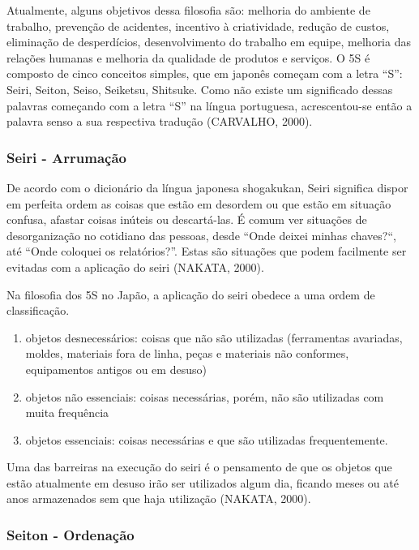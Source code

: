 \documentclass[
]{article}
\begin{document}
Atualmente, alguns objetivos dessa filosofia são: melhoria do ambiente de trabalho, prevenção de acidentes, incentivo à criatividade, redução de custos, eliminação de desperdícios, desenvolvimento do trabalho em equipe, melhoria das relações humanas e melhoria da qualidade de produtos e serviços. O 5S é composto de cinco conceitos simples, que em japonês começam com a letra ``S'': Seiri, Seiton, Seiso, Seiketsu, Shitsuke. Como não existe um significado dessas palavras começando com a letra ``S'' na língua portuguesa, acrescentou-se então a palavra senso a sua respectiva tradução (CARVALHO, 2000).

\hypertarget{seiri---arrumauxe7uxe3o}{%
\subsubsection{Seiri - Arrumação}\label{seiri---arrumauxe7uxe3o}}

De acordo com o dicionário da língua japonesa shogakukan, Seiri significa dispor em perfeita ordem as coisas que estão em desordem ou que estão em situação confusa, afastar coisas inúteis ou descartá-las. É comum ver situações de desorganização no cotidiano das pessoas, desde ``Onde deixei minhas chaves?{}``, até ``Onde coloquei os relatórios?''. Estas são situações que podem facilmente ser evitadas com a aplicação do seiri (NAKATA, 2000).

Na filosofia dos 5S no Japão, a aplicação do seiri obedece a uma ordem de classificação.

\begin{enumerate}
\def\labelenumi{\alph{enumi})}
\item
  objetos desnecessários: coisas que não são utilizadas (ferramentas avariadas, moldes, materiais fora de linha, peças e materiais não conformes, equipamentos antigos ou em desuso)
\item
  objetos não essenciais: coisas necessárias, porém, não são utilizadas com muita frequência
\item
  objetos essenciais: coisas necessárias e que são utilizadas frequentemente.
\end{enumerate}

Uma das barreiras na execução do seiri é o pensamento de que os objetos que estão atualmente em desuso irão ser utilizados algum dia, ficando meses ou até anos armazenados sem que haja utilização (NAKATA, 2000).

\hypertarget{seiton---ordenauxe7uxe3o}{%
\subsubsection{Seiton - Ordenação}\label{seiton---ordenauxe7uxe3o}}
\end{document}
